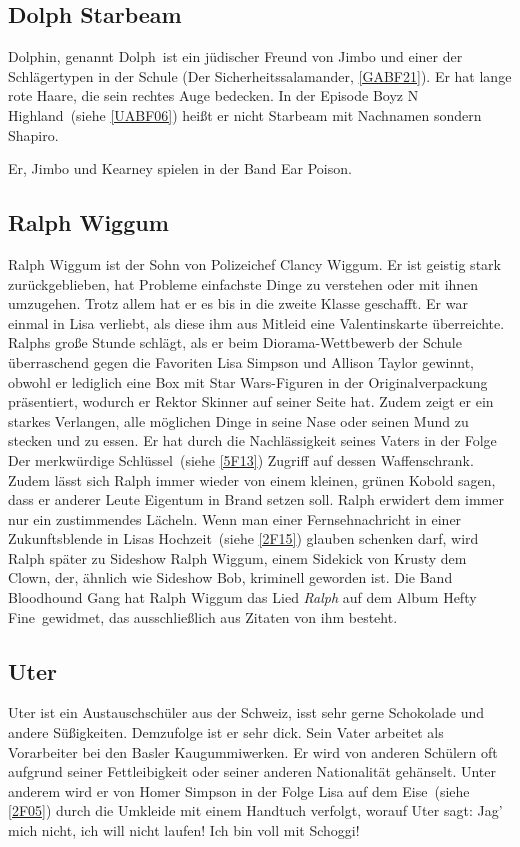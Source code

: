 \subsection{Dolph Starbeam}\label{DolphStarbeam}
Dolphin, genannt \glqq Dolph\grqq\ ist ein jüdischer Freund von Jimbo und einer der Schlägertypen in der Schule (\glqq Der Sicherheitssalamander\grqq , \ref{GABF21}). Er hat lange rote Haare, die sein rechtes Auge bedecken. In der Episode \glqq Boyz N Highland\grqq\ (siehe \ref{UABF06}) heißt er nicht Starbeam mit Nachnamen sondern Shapiro.

Er, Jimbo und Kearney spielen in der Band \glqq Ear Poison\grqq .

\subsection{Ralph Wiggum}
Ralph Wiggum ist der Sohn von Polizeichef Clancy Wiggum. Er ist geistig stark zurückgeblieben, hat Probleme einfachste Dinge zu verstehen oder mit ihnen umzugehen. Trotz allem hat er es bis in die zweite Klasse geschafft. Er war einmal in Lisa verliebt, als diese ihm aus Mitleid eine Valentinskarte überreichte. Ralphs große Stunde schlägt, als er beim Diorama-Wettbewerb der Schule überraschend gegen die Favoriten Lisa Simpson und Allison Taylor gewinnt, obwohl er lediglich eine Box mit Star Wars-Figuren in der Originalverpackung präsentiert, wodurch er Rektor Skinner auf seiner Seite hat. Zudem zeigt er ein starkes Verlangen, alle möglichen Dinge in seine Nase oder seinen Mund zu stecken und zu essen. Er hat durch die Nachlässigkeit seines Vaters in der Folge \glqq Der merkwürdige Schlüssel\grqq\ (siehe \ref{5F13}) Zugriff auf dessen Waffenschrank. Zudem lässt sich Ralph immer wieder von einem kleinen, grünen Kobold sagen, dass er anderer Leute Eigentum in Brand setzen soll. Ralph erwidert dem immer nur ein zustimmendes Lächeln. Wenn man einer Fernsehnachricht in einer Zukunftsblende in \glqq Lisas Hochzeit\grqq\ (siehe \ref{2F15}) glauben schenken darf, wird Ralph später zu Sideshow Ralph Wiggum, einem Sidekick von Krusty dem Clown, der, ähnlich wie Sideshow Bob, kriminell geworden ist. Die Band Bloodhound Gang hat Ralph Wiggum das Lied \emph{Ralph} auf dem Album \glqq Hefty Fine\grqq\ gewidmet, das ausschließlich aus Zitaten von ihm besteht.

\subsection{Uter}
Uter ist ein Austauschschüler aus der Schweiz, isst sehr gerne Schokolade und andere Süßigkeiten. Demzufolge ist er sehr dick. Sein Vater arbeitet als Vorarbeiter bei den Basler Kaugummiwerken. Er wird von anderen Schülern oft aufgrund seiner Fettleibigkeit oder seiner anderen Nationalität gehänselt. Unter anderem wird er von Homer Simpson in der Folge \glqq Lisa auf dem Eise\grqq\ (siehe \ref{2F05}) durch die Umkleide mit einem Handtuch verfolgt, worauf Uter sagt: \glqq Jag' mich nicht, ich will nicht laufen! Ich bin voll mit Schoggi!\grqq

